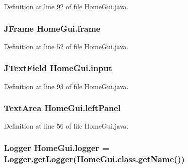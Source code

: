 Definition at line 92 of file Home\-Gui.\-java.

\hypertarget{class_home_gui_a0b1781db25b8fdacc8970aa6166b11ad}{
\subsubsection[{frame}]{\setlength{\rightskip}{0pt plus 5cm}J\-Frame {\bf Home\-Gui.\-frame}}}\label{class_home_gui_a0b1781db25b8fdacc8970aa6166b11ad}


Definition at line 52 of file Home\-Gui.\-java.

\hypertarget{class_home_gui_ab33ea273ae2f2c5bde32041076af630c}{
\subsubsection[{input}]{\setlength{\rightskip}{0pt plus 5cm}J\-Text\-Field {\bf Home\-Gui.\-input}}}\label{class_home_gui_ab33ea273ae2f2c5bde32041076af630c}


Definition at line 93 of file Home\-Gui.\-java.

\hypertarget{class_home_gui_ac6ba89ab2c3204e87ec00b9b4962f327}{
\subsubsection[{left\-Panel}]{\setlength{\rightskip}{0pt plus 5cm}Text\-Area {\bf Home\-Gui.\-left\-Panel}}}\label{class_home_gui_ac6ba89ab2c3204e87ec00b9b4962f327}


Definition at line 56 of file Home\-Gui.\-java.

\hypertarget{class_home_gui_a6eef831dc2ff4533740f3395c4b9067a}{
\subsubsection[{logger}]{\setlength{\rightskip}{0pt plus 5cm}Logger {\bf Home\-Gui.\-logger} = Logger.\-get\-Logger(Home\-Gui.\-class.\-get\-Name())}}\label{class_home_gui_a6eef831dc2ff4533740f3395c4b9067a}


